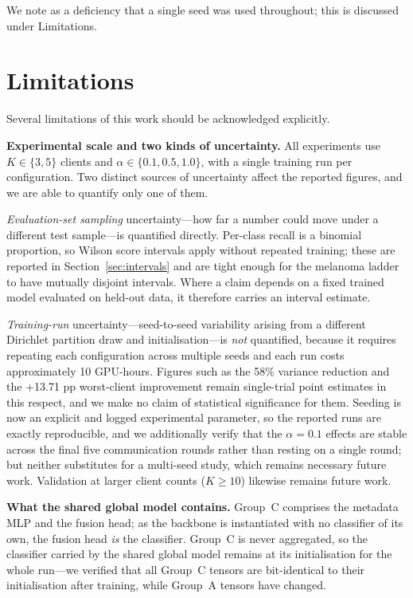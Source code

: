 \documentclass[utf8]{FrontiersinHarvard} %
\begin{document}
We note as a deficiency that a single seed was used throughout; this is discussed under Limitations.

\section{Limitations}

Several limitations of this work should be acknowledged explicitly.

\textbf{Experimental scale and two kinds of uncertainty.} All experiments use $K \in \{3, 5\}$ clients and $\alpha \in \{0.1, 0.5, 1.0\}$, with a single training run per configuration. Two distinct sources of uncertainty affect the reported figures, and we are able to quantify only one of them.

\emph{Evaluation-set sampling} uncertainty---how far a number could move under a different test sample---is quantified directly. Per-class recall is a binomial proportion, so Wilson score intervals apply without repeated training; these are reported in Section~\ref{sec:intervals} and are tight enough for the melanoma ladder to have mutually disjoint intervals. Where a claim depends on a fixed trained model evaluated on held-out data, it therefore carries an interval estimate.

\emph{Training-run} uncertainty---seed-to-seed variability arising from a different Dirichlet partition draw and initialisation---is \emph{not} quantified, because it requires repeating each configuration across multiple seeds and each run costs approximately 10 GPU-hours. Figures such as the 58\% variance reduction and the +13.71 pp worst-client improvement remain single-trial point estimates in this respect, and we make no claim of statistical significance for them. Seeding is now an explicit and logged experimental parameter, so the reported runs are exactly reproducible, and we additionally verify that the $\alpha = 0.1$ effects are stable across the final five communication rounds rather than resting on a single round; but neither substitutes for a multi-seed study, which remains necessary future work. Validation at larger client counts ($K \ge 10$) likewise remains future work.

\textbf{What the shared global model contains.} Group~C comprises the metadata MLP and the fusion head; as the backbone is instantiated with no classifier of its own, the fusion head \emph{is} the classifier. Group~C is never aggregated, so the classifier carried by the shared global model remains at its initialisation for the whole run---we verified that all Group~C tensors are bit-identical to their initialisation after training, while Group~A tensors have changed.
\end{document}
